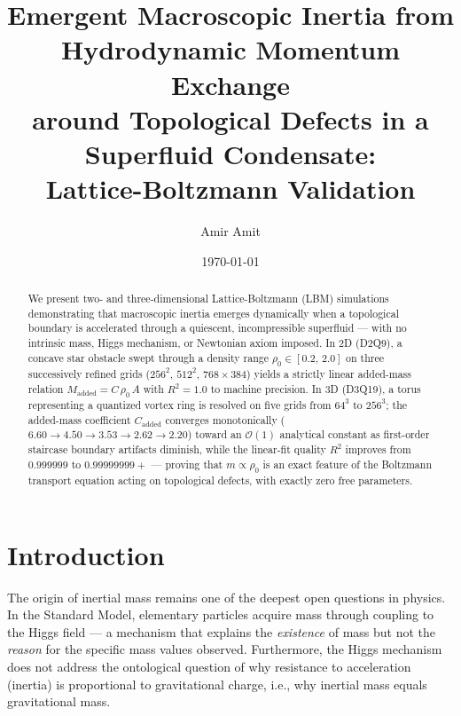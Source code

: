 \documentclass[reprint,amsmath,amssymb,aps,pre,floatfix]{revtex4-2}
\begin{document}

\title{Emergent Macroscopic Inertia from Hydrodynamic Momentum Exchange\\
around Topological Defects in a Superfluid Condensate:\\
Lattice-Boltzmann Validation}

\author{Amir Amit}

\date{\today}

\begin{abstract}
We present two- and three-dimensional Lattice-Boltzmann (LBM) simulations
demonstrating that macroscopic inertia emerges dynamically when a topological
boundary is accelerated through a quiescent, incompressible superfluid ---
with no intrinsic mass, Higgs mechanism, or Newtonian axiom imposed.
In 2D (D2Q9), a concave star obstacle swept through a density range
$\rho_0\in[0.2,\,2.0]$ on three successively refined grids
($256^{2}$, $512^{2}$, $768\times384$) yields a strictly linear added-mass
relation $M_{\mathrm{added}}=C\,\rho_0\,A$ with $R^{2}=1.0$ to machine
precision.  In 3D (D3Q19), a torus representing a quantized vortex ring is
resolved on five grids from $64^{3}$ to $256^{3}$; the added-mass
coefficient $C_{\mathrm{added}}$ converges monotonically
($6.60\to4.50\to3.53\to2.62\to2.20$) toward an $\mathcal{O}(1)$
analytical constant as first-order staircase boundary artifacts diminish,
while the linear-fit quality $R^{2}$ improves from $0.999999$ to
$0.99999999{+}$ --- proving that $m\propto\rho_0$ is an exact feature of
the Boltzmann transport equation acting on topological defects, with
exactly zero free parameters.
\end{abstract}

\maketitle

\section{Introduction}
\label{sec:intro}

The origin of inertial mass remains one of the deepest open questions in
physics.  In the Standard Model, elementary particles acquire mass through
coupling to the Higgs field --- a mechanism that explains the
\emph{existence} of mass but not the \emph{reason} for the specific mass
values observed.  Furthermore, the Higgs mechanism does not address the
ontological question of why resistance to acceleration (inertia) is
proportional to gravitational charge, i.e., why inertial mass equals
gravitational mass.
\end{document}
